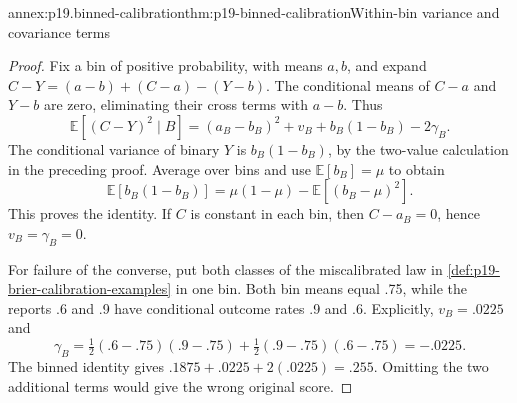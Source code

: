 \begin{annexitem}{annex:p19.binned-calibration}{thm:p19-binned-calibration}{Within-bin variance and covariance terms}
\begin{proof}
Fix a bin of positive probability, with means \(a,b\), and expand
\(C-Y=(a-b)+(C-a)-(Y-b)\). The conditional means of \(C-a\) and
\(Y-b\) are zero, eliminating their cross terms with \(a-b\). Thus
\[
 \mathbb E[(C-Y)^2\mid B]
 =(a_B-b_B)^2+v_B+b_B(1-b_B)-2\gamma_B.
\]
The conditional variance of binary \(Y\) is \(b_B(1-b_B)\), by the
two-value calculation in the preceding proof. Average over bins and use
\(\mathbb E[b_B]=\mu\) to obtain
\[
 \mathbb E[b_B(1-b_B)]
 =\mu(1-\mu)-\mathbb E[(b_B-\mu)^2].
\]
This proves the identity. If \(C\) is constant in each bin, then
\(C-a_B=0\), hence \(v_B=\gamma_B=0\).

For failure of the converse, put both classes of the miscalibrated law in
\cref{def:p19-brier-calibration-examples} in one bin. Both bin means
equal .75, while the reports .6 and .9 have conditional outcome rates
.9 and .6. Explicitly, \(v_B=.0225\) and
\[
 \gamma_B=\tfrac12(.6-.75)(.9-.75)
          +\tfrac12(.9-.75)(.6-.75)=-.0225.
\]
The binned identity gives \(.1875+.0225+2(.0225)=.255\).
Omitting the two additional terms would give the wrong original score.
\end{proof}
\end{annexitem}

